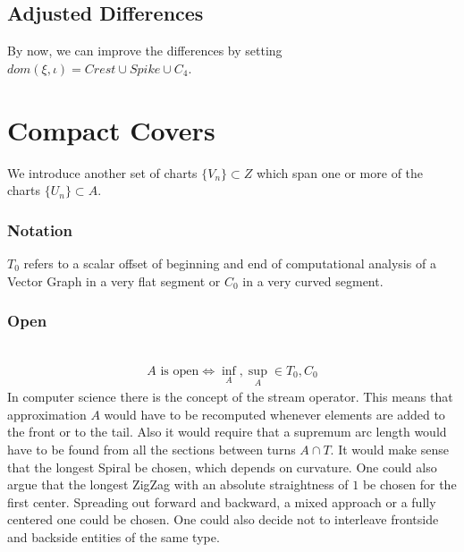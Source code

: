 \documentclass{report}
\begin{document}
\subsection*{Adjusted Differences}
By now, we can improve the differences by setting $dom(\xi,\iota)=Crest \cup Spike \cup C_{4}$.

\section{Compact Covers}
We introduce another set of charts $\{V_{n}\} \subset Z$ which span one or more of the charts $\{U_{n}\} \subset A$.
\subsubsection*{Notation}
$T_{0}$ refers to a scalar offset of beginning and end of computational analysis of a Vector Graph in a very flat segment or $C_{0}$ in a very curved segment.
\subsubsection*{Open}
~\cite{Mortad}
\begin{align}
A \text{ is open} \Leftrightarrow \inf_{A},\sup_{A}\in T_{0},C_{0}
\end{align}
In computer science there is the concept of the stream operator. This means that approximation $A$ would have to be recomputed whenever elements are added to the front or to the tail. Also it would require that a supremum arc length would have to be found from all the sections between turns $A \cap T$. It would make sense that the longest Spiral be chosen, which depends on curvature. One could also argue that the longest ZigZag with an absolute straightness of $1$ be chosen for the first center. Spreading out forward and backward, a mixed approach or a fully centered one could be chosen. One could also decide not to interleave frontside and backside entities of the same type.
\end{document}

